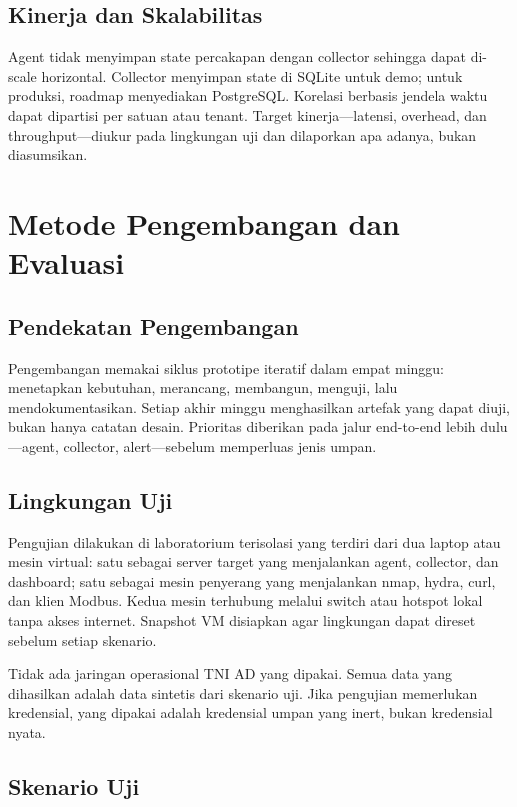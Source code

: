 \documentclass[12pt,a4paper]{article}
\begin{document}
\subsection{Kinerja dan Skalabilitas}

Agent tidak menyimpan state percakapan dengan collector sehingga dapat di-scale horizontal. Collector menyimpan state di SQLite untuk demo; untuk produksi, roadmap menyediakan PostgreSQL. Korelasi berbasis jendela waktu dapat dipartisi per satuan atau tenant. Target kinerja---latensi, overhead, dan throughput---diukur pada lingkungan uji dan dilaporkan apa adanya, bukan diasumsikan.

\section{Metode Pengembangan dan Evaluasi}

\subsection{Pendekatan Pengembangan}

Pengembangan memakai siklus prototipe iteratif dalam empat minggu: menetapkan kebutuhan, merancang, membangun, menguji, lalu mendokumentasikan. Setiap akhir minggu menghasilkan artefak yang dapat diuji, bukan hanya catatan desain. Prioritas diberikan pada jalur end-to-end lebih dulu---agent, collector, alert---sebelum memperluas jenis umpan.

\subsection{Lingkungan Uji}

Pengujian dilakukan di laboratorium terisolasi yang terdiri dari dua laptop atau mesin virtual: satu sebagai server target yang menjalankan agent, collector, dan dashboard; satu sebagai mesin penyerang yang menjalankan nmap, hydra, curl, dan klien Modbus. Kedua mesin terhubung melalui switch atau hotspot lokal tanpa akses internet. Snapshot VM disiapkan agar lingkungan dapat direset sebelum setiap skenario.

Tidak ada jaringan operasional TNI AD yang dipakai. Semua data yang dihasilkan adalah data sintetis dari skenario uji. Jika pengujian memerlukan kredensial, yang dipakai adalah kredensial umpan yang inert, bukan kredensial nyata.

\subsection{Skenario Uji}
\end{document}
